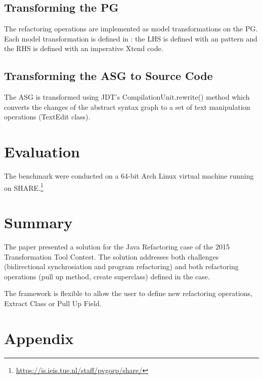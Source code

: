 \documentclass[submission,copyright,creativecommons]{eptcs}
\begin{document}
\subsection{Transforming the PG}

The refactoring operations are implemented as model transformations on the PG. Each model transformation is defined in \viatra: the LHS is defined with an \eiq pattern and the RHS is defined with an imperative Xtend code.

\subsection{Transforming the ASG to Source Code}

The ASG is transformed using JDT's \textsf{CompilationUnit.rewrite()} method which converts the changes of the abstract syntax graph to a set of text manipulation operations (\textsf{TextEdit} class).

\section{Evaluation}

The benchmark were conducted on a 64-bit Arch Linux virtual machine running on SHARE.\footnote{\url{https://is.ieis.tue.nl/staff/pvgorp/share/}}


\section{Summary}

The paper presented a solution for the Java Refactoring case of the 2015 Transformation Tool Contest. The solution addresses both challenges (bidirectional synchrosiation and program refactoring) and both refactoring operations (pull up method, create superclass) defined in the case.

The framework is flexible to allow the user to define new refactoring operations, \eg \textsf{Extract Class} or \textsf{Pull Up Field}.




\clearpage

\appendix
\section{Appendix}


\end{document}
